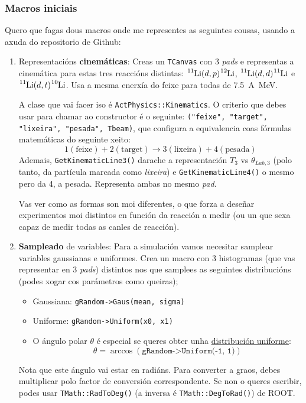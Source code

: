 \documentclass[11pt, a4paper]{article}
\newcommand{\iso}[2]{\ce{^{#1}#2}}
\begin{document}
\subsubsection*{Macros iniciais}
Quero que fagas dous macros onde me representes as seguintes cousas, usando a axuda do repositorio de Github:
\begin{enumerate}
    \item Representacións \textbf{cinemáticas}: Creas un \lstinline|TCanvas| con 3 \textit{pads} e representas a cinemática para estas tres reaccións distintas: $\iso{11}{Li}(d, p)\iso{12}{Li}$, $\iso{11}{Li}(d, d)\iso{11}{Li}$ e $\iso{11}{Li}(d, t)\iso{10}{Li}$. Usa a mesma enerxía do feixe para todas de \qty{7.5}{A\MeV}.

          A clase que vai facer iso é \lstinline|ActPhysics::Kinematics|. O criterio que debes usar para chamar ao constructor é o seguinte: \lstinline|("feixe", "target", "lixeira", "pesada", Tbeam)|, que configura a equivalencia coas fórmulas matemáticas do seguinte xeito: $$1 (\text{feixe}) + 2 (\text{target}) \longrightarrow 3 (\text{lixeira}) + 4 (\text{pesada})$$
          Ademais, \lstinline|GetKinematicLine3()| darache a representación $T_3$ vs $\theta_{Lab, 3}$ (polo tanto, da partícula marcada como \textit{lixeira}) e \lstinline|GetKinematicLine4()| o mesmo pero da 4, a pesada. Representa ambas no mesmo \textit{pad}.

          Vas ver como as formas son moi diferentes, o que forza a deseñar experimentos moi distintos en función da reacción a medir (ou un que sexa capaz de medir todas as canles de reacción).

    \item \textbf{Sampleado} de variables: Para a simulación vamos necesitar samplear variables gaussianas e uniformes. Crea un macro con 3 histogramas (que vas representar en 3 \textit{pads}) distintos nos que samplees as seguintes distribucións (podes xogar cos parámetros como queiras);
          \begin{itemize}
              \item Gaussiana: \lstinline|gRandom->Gaus(mean, sigma)|
              \item Uniforme: \lstinline|gRandom->Uniform(x0, x1)|
              \item O ángulo polar $\theta$ é especial se queres obter unha \href{https://mathworld.wolfram.com/SpherePointPicking.html}{distribución uniforme}:
                    $$\theta = \arccos\left(\texttt{gRandom->Uniform(-1, 1)}\right)$$
          \end{itemize}
          Nota que este ángulo vai estar en radiáns. Para converter a graos, debes multiplicar polo factor de conversión correspondente. Se non o queres escribir, podes usar \lstinline|TMath::RadToDeg()| (a inversa é \lstinline|TMath::DegToRad()|) de ROOT.
\end{enumerate}
\end{document}
